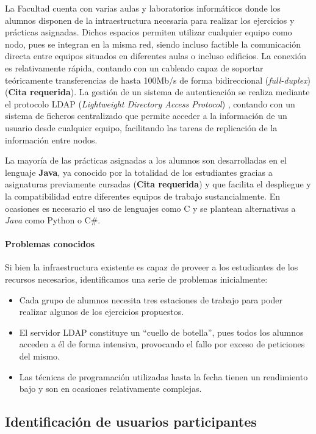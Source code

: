 La Facultad cuenta con varias aulas y laboratorios informáticos donde los alumnos disponen de la intraestructura necesaria para realizar los ejercicios y prácticas asignadas. Dichos espacios permiten utilizar cualquier equipo como nodo, pues se integran en la misma red, siendo incluso factible la comunicación directa entre equipos situados en diferentes aulas o incluso edificios. La conexión es relativamente rápida, contando con un cableado capaz de soportar teóricamente transferencias de hasta 100Mb/s de forma bidireccional (\textit{full-duplex}) (\textbf{Cita requerida}). La gestión de un sistema de autenticación se realiza mediante el protocolo LDAP (\textit{Lightweight Directory Access Protocol}) \cite{RFC4516-comment}, contando con un sistema de ficheros centralizado que permite acceder a la información de un usuario desde cualquier equipo, facilitando las tareas de replicación de la información entre nodos.

La mayoría de las prácticas asignadas a los alumnos son desarrolladas en el lenguaje \textbf{Java}, ya conocido por la totalidad de los estudiantes gracias a asignaturas previamente cursadas (\textbf{Cita requerida}) y que facilita el despliegue y la compatibilidad entre diferentes equipos de trabajo sustancialmente. En ocasiones es necesario el uso de lenguajes como C y se plantean alternativas a \textit{Java} como Python o C\#.

\paragraph{Problemas conocidos}

Si bien la infraestructura existente es capaz de proveer a los estudiantes de los recursos necesarios, identificamos una serie de problemas inicialmente:

\begin{itemize}
  \item Cada grupo de alumnos necesita tres estaciones de trabajo para poder realizar algunos de los ejercicios propuestos.
  \item El servidor LDAP constituye un ``cuello de botella'', pues todos los alumnos acceden a él de forma intensiva, provocando el fallo por exceso de peticiones del mismo.
  \item Las técnicas de programación utilizadas hasta la fecha tienen un rendimiento bajo y son en ocasiones relativamente complejas.
\end{itemize}

\subsection{Identificación de usuarios participantes}

